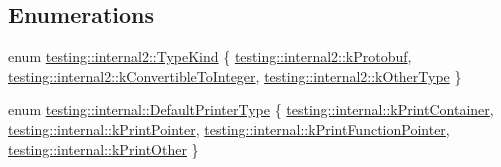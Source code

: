 \subsection*{Enumerations}
\begin{DoxyCompactItemize}
\item 
enum \hyperlink{namespacetesting_1_1internal2_aeb8161b0b3ee503347b0662d7028fd57}{testing\+::internal2\+::\+Type\+Kind} \{ \hyperlink{namespacetesting_1_1internal2_aeb8161b0b3ee503347b0662d7028fd57a14aaf98a2547ecf43eef0868d54b1383}{testing\+::internal2\+::k\+Protobuf}, 
\hyperlink{namespacetesting_1_1internal2_aeb8161b0b3ee503347b0662d7028fd57a9bdcf3f1548f498b2b7f097306ea0224}{testing\+::internal2\+::k\+Convertible\+To\+Integer}, 
\hyperlink{namespacetesting_1_1internal2_aeb8161b0b3ee503347b0662d7028fd57abe8aaea44751d6ebd0cdf5bd94451db1}{testing\+::internal2\+::k\+Other\+Type}
 \}
\item 
enum \hyperlink{namespacetesting_1_1internal_a17fb8f0125fa92404a249ed38a43faa4}{testing\+::internal\+::\+Default\+Printer\+Type} \{ \hyperlink{namespacetesting_1_1internal_a17fb8f0125fa92404a249ed38a43faa4a945a19e59155ce1d335e8c3bcbdf61db}{testing\+::internal\+::k\+Print\+Container}, 
\hyperlink{namespacetesting_1_1internal_a17fb8f0125fa92404a249ed38a43faa4a8eaa6fff4a58832b30027df49f73dcbf}{testing\+::internal\+::k\+Print\+Pointer}, 
\hyperlink{namespacetesting_1_1internal_a17fb8f0125fa92404a249ed38a43faa4a5a066cde30e276c6460ba10d123d0c2c}{testing\+::internal\+::k\+Print\+Function\+Pointer}, 
\hyperlink{namespacetesting_1_1internal_a17fb8f0125fa92404a249ed38a43faa4a6f88d77d9d763d8a009caf950cfbab28}{testing\+::internal\+::k\+Print\+Other}
 \}
\end{DoxyCompactItemize}
